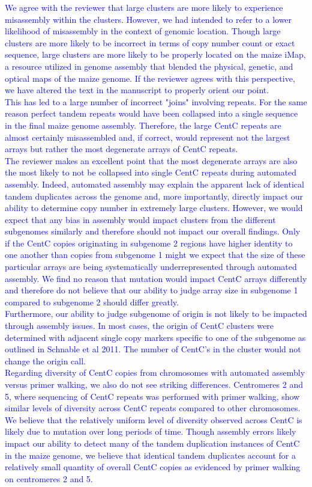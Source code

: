 \documentclass[]{article}
\newcommand{\res}[1]{\noindent \textcolor{blue}{{#1}} \\}
\begin{document}
\res{We agree with the reviewer that large clusters are more likely to experience misassembly within the clusters.  
However, we had intended to refer to a lower likelihood of misassembly in the context of genomic location.  
Though large clusters are more likely to be incorrect in terms of copy number count or exact sequence, large clusters are more likely to be properly located on the maize iMap, a resource utilized in genome assembly that blended the physical, genetic, and optical maps of the maize genome.  
If the reviewer agrees with this perspective, we have altered the text in the manuscript to properly orient our point.}

\res{This has led to a large number of incorrect "joins" involving repeats.  
For the same reason perfect tandem repeats would have been collapsed into a single sequence in the final maize genome assembly.  
Therefore, the large CentC repeats are almost certainly misassembled and, if correct, would represent not the largest arrays but rather the most degenerate arrays of CentC repeats.}

\res{The reviewer makes an excellent point that the most degenerate arrays are also the most likely to not be collapsed into single CentC repeats during automated assembly.  Indeed, automated assembly may explain the apparent lack of identical tandem duplicates across the genome and, more importantly, directly impact our ability to determine copy number in extremely large clusters.  However, we would expect that any bias in assembly would impact clusters from the different subgenomes similarly and therefore should not impact our overall findings.  Only if the CentC copies originating in subgenome 2 regions have higher identity to one another than copies from subgenome 1 might we expect that the size of these particular arrays are being systematically underrepresented through automated assembly. We find no reason that mutation would impact CentC arrays differently and therefore do not believe that our ability to judge array size in subgenome 1 compared to subgenome 2 should differ greatly. }

\res{Furthermore, our ability to judge subgenome of origin is not likely to be impacted through assembly issues. In most cases, the origin of CentC clusters were determined with adjacent single copy markers specific to one of the subgenome as outlined in Schnable et al 2011.  The number of CentC's in the cluster would not change the origin call.}

\res{Regarding diversity of CentC copies from chromosomes with automated assembly versus primer walking, we also do not see striking differences.  Centromeres 2 and 5, where sequencing of CentC repeats was performed with primer walking, show similar levels of diversity across CentC repeats compared to other chromosomes.  We believe that the relatively uniform level of diversity observed across CentC is likely due to mutation over long periods of time.  Though assembly errors likely impact our ability to detect many of the tandem duplication instances of CentC in the maize genome, we believe that identical tandem duplicates account for a relatively small quantity of overall CentC copies as evidenced by primer walking on centromeres 2 and 5. }
\end{document}
